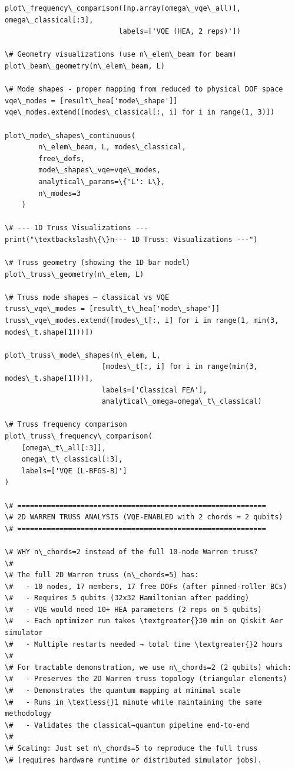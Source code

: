 \documentclass[12pt, a4paper]{article}
\begin{document}
\begin{lstlisting}[style=codestyle, caption={{main.py --- Pipeline Orchestrator}}]
plot\_frequency\_comparison([np.array(omega\_vqe\_all)], omega\_classical[:3],
                           labels=['VQE (HEA, 2 reps)'])

\# Geometry visualizations (use n\_elem\_beam for beam)
plot\_beam\_geometry(n\_elem\_beam, L)

\# Mode shapes - proper mapping from reduced to physical DOF space
vqe\_modes = [result\_hea['mode\_shape']]
vqe\_modes.extend([modes\_classical[:, i] for i in range(1, 3)])

plot\_mode\_shapes\_continuous(
        n\_elem\_beam, L, modes\_classical,
        free\_dofs,
        mode\_shapes\_vqe=vqe\_modes,
        analytical\_params=\{'L': L\},
        n\_modes=3
    )

\# --- 1D Truss Visualizations ---
print("\textbackslash\{\}n--- 1D Truss: Visualizations ---")

\# Truss geometry (showing the 1D bar model)
plot\_truss\_geometry(n\_elem, L)

\# Truss mode shapes — classical vs VQE
truss\_vqe\_modes = [result\_t\_hea['mode\_shape']]
truss\_vqe\_modes.extend([modes\_t[:, i] for i in range(1, min(3, modes\_t.shape[1]))])

plot\_truss\_mode\_shapes(n\_elem, L,
                       [modes\_t[:, i] for i in range(min(3, modes\_t.shape[1]))],
                       labels=['Classical FEA'],
                       analytical\_omega=omega\_t\_classical)

\# Truss frequency comparison
plot\_truss\_frequency\_comparison(
    [omega\_t\_all[:3]],
    omega\_t\_classical[:3],
    labels=['VQE (L-BFGS-B)']
)

\# ===========================================================
\# 2D WARREN TRUSS ANALYSIS (VQE-ENABLED with 2 chords = 2 qubits)
\# ===========================================================

\# WHY n\_chords=2 instead of the full 10-node Warren truss?
\#
\# The full 2D Warren truss (n\_chords=5) has:
\#   - 10 nodes, 17 members, 17 free DOFs (after pinned-roller BCs)
\#   - Requires 5 qubits (32x32 Hamiltonian after padding)
\#   - VQE would need 10+ HEA parameters (2 reps on 5 qubits)
\#   - Each optimizer run takes \textgreater{}30 min on Qiskit Aer simulator
\#   - Multiple restarts needed → total time \textgreater{}2 hours
\#
\# For tractable demonstration, we use n\_chords=2 (2 qubits) which:
\#   - Preserves the 2D Warren truss topology (triangular elements)
\#   - Demonstrates the quantum mapping at minimal scale
\#   - Runs in \textless{}1 minute while maintaining the same methodology
\#   - Validates the classical→quantum pipeline end-to-end
\#
\# Scaling: Just set n\_chords=5 to reproduce the full truss
\# (requires hardware runtime or distributed simulator jobs).


\end{lstlisting}
\end{document}
